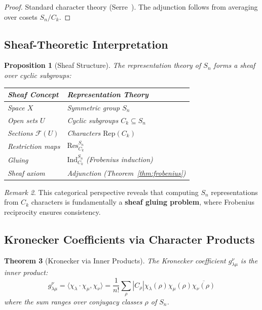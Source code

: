 \documentclass[11pt]{article}
\newtheorem{theorem}{Theorem}[section]
\newtheorem{proposition}[theorem]{Proposition}
\theoremstyle{definition}
\theoremstyle{remark}
\newtheorem{remark}[theorem]{Remark}
\begin{document}
\begin{proof}
Standard character theory (Serre~\cite{serre1977}). The adjunction follows from averaging over cosets $S_n/C_k$.
\end{proof}

\subsection{Sheaf-Theoretic Interpretation}

\begin{proposition}[Sheaf Structure]\label{prop:sheaf_structure}
The representation theory of $S_n$ forms a sheaf over cyclic subgroups:
\begin{center}
\begin{tabular}{ll}
\toprule
\textbf{Sheaf Concept} & \textbf{Representation Theory} \\
\midrule
Space $X$ & Symmetric group $S_n$ \\
Open sets $U$ & Cyclic subgroups $C_k \subseteq S_n$ \\
Sections $\mathcal{F}(U)$ & Characters $\text{Rep}(C_k)$ \\
Restriction maps & $\text{Res}^{S_n}_{C_k}$ \\
Gluing & $\text{Ind}_{C_k}^{S_n}$ (Frobenius induction) \\
Sheaf axiom & Adjunction (Theorem~\ref{thm:frobenius}) \\
\bottomrule
\end{tabular}
\end{center}
\end{proposition}

\begin{remark}
This categorical perspective reveals that computing $S_n$ representations from $C_k$ characters is fundamentally a \textbf{sheaf gluing problem}, where Frobenius reciprocity ensures consistency.
\end{remark}

\subsection{Kronecker Coefficients via Character Products}

\begin{theorem}[Kronecker via Inner Products]\label{thm:kronecker_formula}
The Kronecker coefficient $g^\nu_{\lambda\mu}$ is the inner product:
\begin{equation}
g^\nu_{\lambda\mu} = \langle \chi_\lambda \cdot \chi_\mu, \chi_\nu \rangle = \frac{1}{n!} \sum_{\rho} |C_\rho| \chi_\lambda(\rho) \chi_\mu(\rho) \overline{\chi_\nu(\rho)}
\end{equation}
where the sum ranges over conjugacy classes $\rho$ of $S_n$.
\end{theorem}
\end{document}
